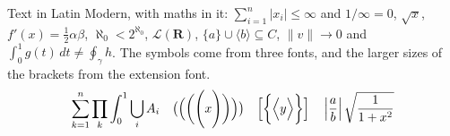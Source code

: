 \documentclass{article}
\begin{document}
Text in Latin Modern, with maths in it: $\sum_{i=1}^n |x_i| \le \infty$ and
$1/\infty = 0$, $\sqrt{x}$, $f'(x) = \frac{1}{2}\alpha\beta$, $\aleph_0 <
2^{\aleph_0}$, $\mathcal{L}(\mathbf{R})$, $\{a\} \cup \langle b \rangle
\subseteq C$, $\|v\| \to 0$ and $\int_0^1 g(t)\,dt \neq \oint_\gamma h$. The
symbols come from three fonts, and the larger sizes of the brackets from the
extension font.
\[ \sum_{k=1}^{n} \prod_{k} \int_0^1 \bigcup_{i} A_i \quad
   \bigl( \Bigl( \biggl( \Biggl( x \Biggr) \biggr) \Bigr) \bigr) \quad
   \Bigl[ \bigg\{ \Big\langle y \Big\rangle \bigg\} \Bigr] \quad
   \left| \frac{a}{b} \right| \sqrt{\frac{1}{1+x^2}} \]
\end{document}
